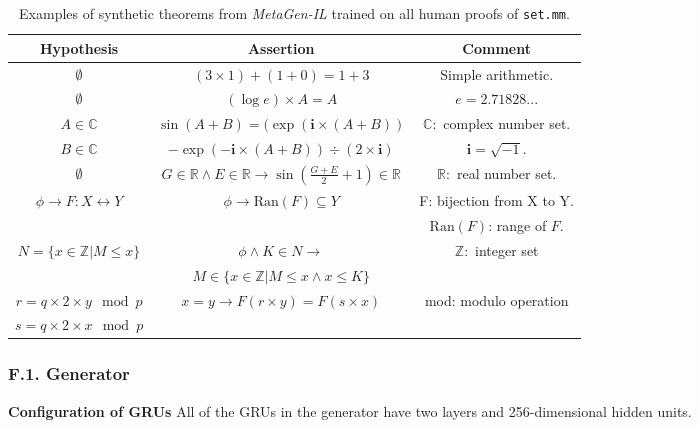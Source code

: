 \documentclass{article}
\begin{document}
\begin{table*}[t]
\caption{Examples of synthetic theorems from \textit{MetaGen-IL} trained on all human proofs of \texttt{set.mm}.}
\label{table:examples}
\begin{center}
\begin{small}
\begin{sc}
\begin{tabular}{c c c}
\toprule
\multicolumn{1}{c}{\bf  Hypothesis } 
&\multicolumn{1}{c}{\bf Assertion } 
&\multicolumn{1}{c}{\bf Comment}
\\ \midrule
$\emptyset$ & $( 3 \times 1 ) + ( 1 + 0 ) = 1 + 3$ & Simple arithmetic.\\ 
\midrule
$\emptyset$& $( \log e ) \times A  = A$ & $e=2.71828...$\\ 
\midrule
$A \in \mathbb{C}$ & $\sin ( A + B ) =(\exp (\mathbf{i}\times ( A + B) )$ & $\mathbb{C}\colon$ complex number set. \\
$B \in \mathbb{C}$ & $ - \exp ( - \mathbf{i}  \times ( A + B )) \div (2 \times \mathbf{i})$ & $\mathbf{i} = \sqrt{-1}$. \\  \midrule
$\emptyset$ & $ G \in \mathbb{R} \land E \in \mathbb{R} \rightarrow \sin ( \frac{ G + E } { 2 } + 1) \in \mathbb{R}$ & $\mathbb{R}\colon$  real number set.\\ \midrule
$\phi \rightarrow F \colon X\leftrightarrow Y$  & 
$\phi \rightarrow \text{Ran} (F) \subseteq Y$ 
&F: bijection from X to Y. \\
&& $\text{Ran}(F)$: range of $F$.\\ \midrule
$N = \{ x \in \mathbb{Z} | M \leq x \}$ & $\phi\land K \in N\rightarrow$  & $\mathbb{Z}\colon$ integer set \\ 
&$ M \in \{ x \in \mathbb{Z} | M \leq x \land x \leq K \}$ &\\
\midrule
$r =  q \times 2 \times y \mod p$ &$x = y \rightarrow F ( r \times y ) = F ( s \times x ) $ & mod: modulo operation \\
$s = q \times 2 \times x \mod p$  && \\ 
\bottomrule
\end{tabular}
\end{sc}
\end{small}
\end{center}
\end{table*}

\subsubsection*{F.1. Generator}
\label{app:generator}
\noindent\textbf{Configuration of GRUs} All of the GRUs in the generator have two layers and 256-dimensional hidden units. 
\end{document}
